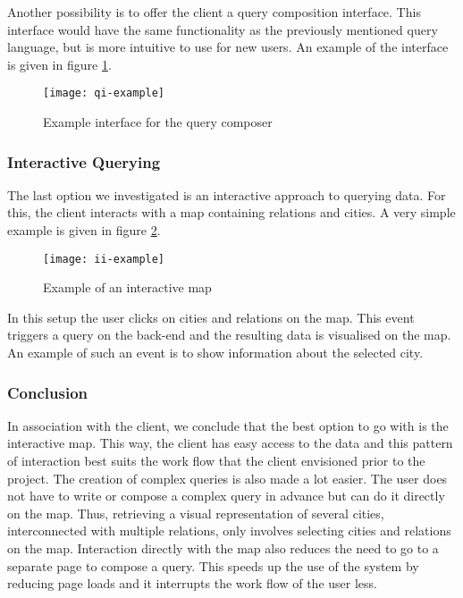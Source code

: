 Another possibility is to offer the client a query composition interface. This interface would have the same functionality as the previously mentioned query language, but is more intuitive to use for new users. An example of the interface is given in figure \ref{fig:qi-example}.

\begin{figure}[ht]
\centering
\texttt{[image: qi-example]}
\caption{Example interface for the query composer}
\label{fig:qi-example}
\end{figure}

\subsubsection{Interactive Querying}

The last option we investigated is an interactive approach to querying data. For this, the client interacts with a map containing relations and cities. A very simple example is given in figure \ref{fig:ii-example}.

\begin{figure}[ht]
\centering
\texttt{[image: ii-example]}
\caption{Example of an interactive map}
\label{fig:ii-example}
\end{figure}

In this setup the user clicks on cities and relations on the map. This event triggers a query on the back-end and the resulting data is visualised on the map. An example of such an event is to show information about the selected city.

\subsubsection{Conclusion}

In association with the client, we conclude that the best option to go with is the interactive map.
This way, the client has easy access to the data and this pattern of interaction best suits the work flow that the client envisioned prior to the project. The creation of complex queries is also made a lot easier. The user does not have to write or compose a complex query in advance but can do it directly on the map. Thus, retrieving a visual representation of several cities, interconnected with multiple relations, only involves selecting cities and relations on the map. Interaction directly with the map also reduces the need to go to a separate page to compose a query. This speeds up the use of the system by reducing page loads and it interrupts the work flow of the user less.